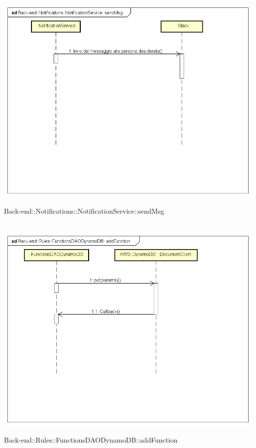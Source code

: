 \\ \includegraphics[width=\textwidth,height=\textheight,keepaspectratio]{images/diagrams/back-end/Ufficial_Backend/Back-end__Notifications__NotificationService__sendMsg.png} 	\caption{Back-end::Notifications::NotificationService::sendMsg}
\\ \includegraphics[width=\textwidth,height=\textheight,keepaspectratio]{images/diagrams/back-end/Ufficial_Backend/Back-end__Rules__FunctionsDAODynamoDB__addFunction.png} 	\caption{Back-end::Rules::FunctionsDAODynamoDB::addFunction}

